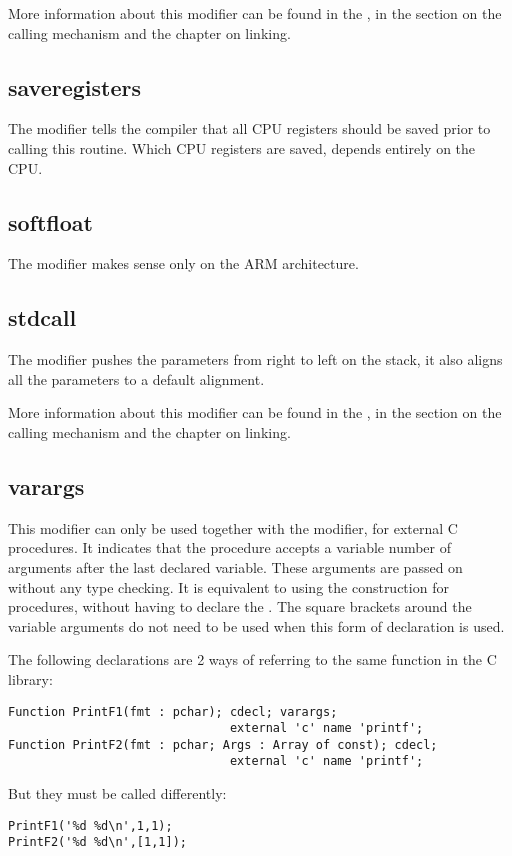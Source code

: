 More information about this modifier can be found in the \progref, in the
section on the calling mechanism and the chapter on linking.

\subsection{saveregisters}
The  modifier tells the compiler that all CPU registers should be 
saved prior to calling this routine. Which CPU registers are saved, depends
entirely on the CPU.

\subsection{softfloat}
The   modifier makes sense only on the ARM architecture.

\subsection{stdcall}
The  modifier pushes the parameters from right to left on the stack,
it also aligns all the parameters to a default alignment.

More information about this modifier can be found in the \progref, in the
section on the calling mechanism and the chapter on linking.

\subsection{varargs}
This modifier can only be used together with the  modifier, for
external C procedures. It indicates that the procedure accepts a variable
number of arguments after the last declared variable. These arguments are
passed on without any type checking. It is equivalent to using the
 construction for  procedures, without having
to declare the . The square brackets around the variable
arguments do not need to be used when this form of declaration is used.

The following declarations are 2 ways of referring to the same function
in the C library:
\begin{verbatim}
Function PrintF1(fmt : pchar); cdecl; varargs;  
                               external 'c' name 'printf';
Function PrintF2(fmt : pchar; Args : Array of const); cdecl;  
                               external 'c' name 'printf';
\end{verbatim}
But they must be called differently:
\begin{verbatim}
PrintF1('%d %d\n',1,1);
PrintF2('%d %d\n',[1,1]);
\end{verbatim}


